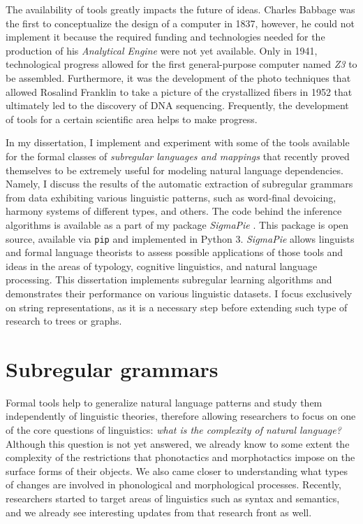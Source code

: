 The availability of tools greatly impacts the future of ideas.
Charles Babbage was the first to conceptualize the design of a computer in 1837, however, he could not implement it because the required funding and technologies needed for the production of his \emph{Analytical Engine} were not yet available.
Only in 1941, technological progress allowed for the first general-purpose computer named \emph{Z3} to be assembled.
Furthermore, it was the development of the photo techniques that allowed Rosalind Franklin to take a picture of the crystallized fibers in 1952 that ultimately led to the discovery of DNA sequencing.
Frequently, the development of tools for a certain scientific area helps to make progress.


In my dissertation, I implement and experiment with some of the tools available for the formal classes of \emph{subregular languages and mappings} that recently proved themselves to be extremely useful for modeling natural language dependencies.
Namely, I discuss the results of the automatic extraction of subregular grammars from data exhibiting various linguistic patterns, such as word-final devoicing, harmony systems of different types, and others.
The code behind the inference algorithms is available as a part of my package \emph{SigmaPie} \href{https://pypi.org/project/SigmaPie/}{\faCube} \citep{sigmapie}.
This package is open source, available via \texttt{pip} and implemented in Python 3.
\emph{SigmaPie} allows linguists and formal language theorists to assess possible applications of those tools and ideas in the areas of typology, cognitive linguistics, and natural language processing.
This dissertation implements subregular learning algorithms and demonstrates their performance on various linguistic datasets.
I focus exclusively on string representations, as it is a necessary step before extending such type of research to trees or graphs.


\section{Subregular grammars}


Formal tools help to generalize natural language patterns and study them independently of linguistic theories, therefore allowing researchers to focus on one of the core questions of linguistics: \emph{what is the complexity of natural language?}
Although this question is not yet answered, we already know to some extent the complexity of the restrictions that phonotactics and morphotactics impose on the surface forms of their objects.
We also came closer to understanding what types of changes are involved in phonological and morphological processes.
Recently, researchers started to target areas of linguistics such as syntax and semantics, and we already see interesting updates from that research front as well.



